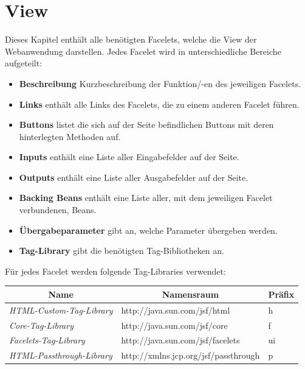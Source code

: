 \chapter{View}
	
		Dieses Kapitel enthält alle benötigten Facelets, welche die View der Webanwendung darstellen. Jedes Facelet wird in unterschiedliche  Bereiche aufgeteilt:
		\begin{itemize}
			\item \textbf{Beschreibung} Kurzbeschreibung der Funktion/-en des jeweiligen Facelets.
			\item \textbf{Links} enthält alle Links des Facelets, die zu einem anderen Facelet führen.
			\item \textbf{Buttons} listet die sich auf der Seite befindlichen Buttons mit deren hinterlegten Methoden auf.
			\item \textbf{Inputs} enthält eine Liste aller Eingabefelder auf der Seite.
			\item \textbf{Outputs} enthält eine Liste aller Ausgabefelder auf der Seite.
			\item \textbf{Backing Beans} enthält eine Liste aller, mit dem jeweiligen Facelet verbundenen, Beans.
			\item \textbf{\"{U}bergabeparameter} gibt an, welche Parameter übergeben werden.
			\item \textbf{Tag-Library} gibt die benötigten Tag-Bibliotheken an.
		\end{itemize}
		Für jedes Facelet werden folgende Tag-Libraries verwendet:
			\begin{center}
				\begin{longtable}{|p{6cm} | p{8cm}| p{2cm}|}
					
					\hline \multicolumn{1}{|c|}{\textbf{Name}} & \multicolumn{1}{c|}{\textbf{Namensraum}} & \multicolumn{1}{c|}{\textbf{Präfix}} \\ \hline
					\endfirsthead
					\hline
					\endlastfoot
					\textit{HTML-Custom-Tag-Library} & http://java.sun.com/jsf/html & h\\ \hline
					\textit{Core-Tag-Library} & http://java.sun.com/jsf/core & f\\ \hline
					\textit{Facelets-Tag-Library} & http://java.sun.com/jsf/facelets & ui\\ \hline
					\textit{HTML-Passthrough-Library} & http://xmlns.jcp.org/jsf/passthrough & p\\ \hline
				\end{longtable}
			\end{center}
		

